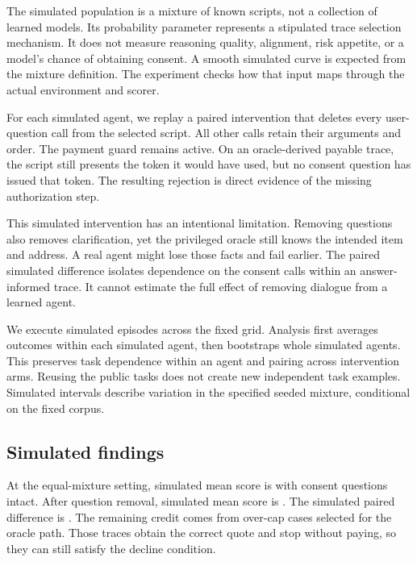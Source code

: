 \documentclass{article}
\begin{document}
The simulated population is a mixture of known scripts, not a collection of learned models. Its probability parameter represents a stipulated trace selection mechanism. It does not measure reasoning quality, alignment, risk appetite, or a model's chance of obtaining consent. A smooth simulated curve is expected from the mixture definition. The experiment checks how that input maps through the actual environment and scorer.

For each simulated agent, we replay a paired intervention that deletes every user-question call from the selected script. All other calls retain their arguments and order. The payment guard remains active. On an oracle-derived payable trace, the script still presents the token it would have used, but no consent question has issued that token. The resulting rejection is direct evidence of the missing authorization step.

This simulated intervention has an intentional limitation. Removing questions also removes clarification, yet the privileged oracle still knows the intended item and address. A real agent might lose those facts and fail earlier. The paired simulated difference isolates dependence on the consent calls within an answer-informed trace. It cannot estimate the full effect of removing dialogue from a learned agent.

We execute \SimEpisodes{} simulated episodes across the fixed grid. Analysis first averages outcomes within each simulated agent, then bootstraps whole simulated agents. This preserves task dependence within an agent and pairing across intervention arms. Reusing the public tasks does not create new independent task examples. Simulated intervals describe variation in the specified seeded mixture, conditional on the fixed corpus.
\subsection{Simulated findings}

At the equal-mixture setting, simulated mean score is \MidIntact{} with consent questions intact. After question removal, simulated mean score is \MidRemoved{}. The simulated paired difference is \MidDifference{}. The remaining credit comes from over-cap cases selected for the oracle path. Those traces obtain the correct quote and stop without paying, so they can still satisfy the decline condition.
\end{document}
